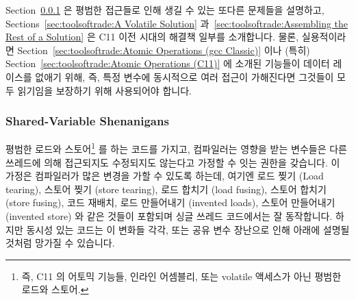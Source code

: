 Section~\ref{sec:toolsoftrade:Shared-Variable Shenanigans}
은 평범한 접근들로 인해 생길 수 있는 또다른 문제들을 설명하고,
Sections~\ref{sec:toolsoftrade:A Volatile Solution}
과~\ref{sec:toolsoftrade:Assembling the Rest of a Solution}
은 C11 이전 시대의 해결책 일부를 소개합니다.
물론, 실용적이라면
Section~\ref{sec:toolsoftrade:Atomic Operations (gcc Classic)}
이나 (특히)
Section~\ref{sec:toolsoftrade:Atomic Operations (C11)}
에 소개된 기능들이 데이터 레이스를 없애기 위해, 즉, 특정 변수에 동시적으로 여러
접근이 가해진다면 그것들이 모두 읽기임을 보장하기 위해 사용되어야 합니다.

\subsubsection{Shared-Variable Shenanigans}
\label{sec:toolsoftrade:Shared-Variable Shenanigans}

평범한 로드와 스토어\footnote{
	즉, C11 의 어토믹 기능들, 인라인 어셈블리, 또는 volatile 액세스가 아닌
	평범한 로드와 스토어.}
를 하는 코드를 가지고, 컴파일러는 영향을 받는 변수들은 다른 쓰레드에 의해
접근되지도 수정되지도 않는다고 가정할 수 잇는 권한을 갖습니다.
이 가정은 컴파일러가 많은 변경을 가할 수 있도록 하는데, 여기엔 로드 찢기 (Load
tearing), 스토어 찢기 (store tearing), 로드 합치기 (load fusing), 스토어 합치기
(store fusing), 코드 재배치, 로드 만들어내기 (invented loads), 스토어
만들어내기 (invented store) 와 같은 것들이 포함되며 싱글 쓰레드 코드에서는 잘
동작합니다.
하지만 동시성 있는 코드는 이 변화들 각각, 또는 공유 변수 장난으로 인해 아래에
설명될 것처럼 망가질 수 있습니다.

